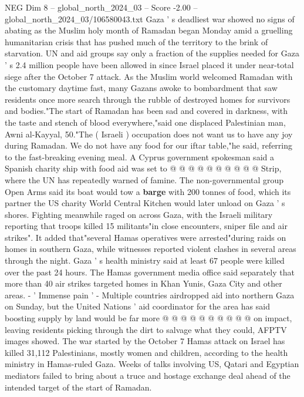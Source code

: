 \begin{textsample}{NEG Dim 8 – global\_north\_2024\_03 – Score -2.00 – global\_north\_2024\_03/106580043.txt}  \label{ex:f8_neg_219}
Gaza ' s deadliest war showed no signs of abating as the Muslim holy month of Ramadan began Monday amid a gruelling humanitarian crisis that has pushed much of the territory to the brink of starvation.
UN and aid groups say only a fraction of the supplies needed for Gaza ' s 2.4 million people have been allowed in since Israel placed it under near-total siege after the October 7 attack.
As the Muslim world welcomed Ramadan with the customary daytime fast, many Gazans awoke to bombardment that saw residents once more search through the rubble of destroyed homes for survivors and bodies."The start of Ramadan has been sad and covered in darkness, with the taste and stench of blood everywhere,"said one displaced Palestinian man, Awni al-Kayyal, 50."The ( Israeli ) occupation does not want us to have any joy during Ramadan.
We do not have any food for our iftar table,"he said, referring to the fast-breaking evening meal.
A Cyprus government spokesman said a Spanish charity ship with food aid was set to @ @ @ @ @ @ @ @ @ @ Strip, where the UN has repeatedly warned of famine.
The non-governmental group Open Arms said its boat would tow a \textbf{barge} with 200 tonnes of food, which its partner the US charity World Central Kitchen would later unload on Gaza ' s shores.
Fighting meanwhile raged on across Gaza, with the Israeli military reporting that troops killed 15 militants"in close encounters, sniper file and air strikes".
It added that"several Hamas operatives were arrested"during raids on homes in southern Gaza, while witnesses reported violent clashes in several areas through the night.
Gaza ' s health ministry said at least 67 people were killed over the past 24 hours.
The Hamas government media office said separately that more than 40 air strikes targeted homes in Khan Yunis, Gaza City and other areas. - ' Immense pain ' - Multiple countries airdropped aid into northern Gaza on Sunday, but the United Nations ' aid coordinator for the area has said boosting supply by land would be far more @ @ @ @ @ @ @ @ @ @ on impact, leaving residents picking through the dirt to salvage what they could, AFPTV images showed.
The war started by the October 7 Hamas attack on Israel has killed 31,112 Palestinians, mostly women and children, according to the health ministry in Hamas-ruled Gaza.
Weeks of talks involving US, Qatari and Egyptian mediators failed to bring about a truce and hostage exchange deal ahead of the intended target of the start of Ramadan.

\end{textsample}

